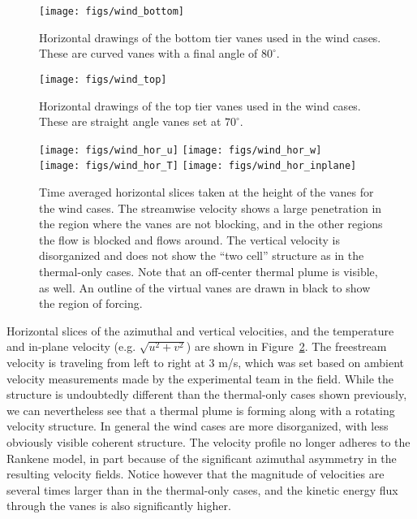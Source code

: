 \begin{figure}[htb]
\centering
\begin{minipage}{0.45\textwidth}
\centering
 \texttt{[image: figs/wind\_bottom]}
 \caption{Horizontal drawings of the bottom tier vanes used in the wind
 cases. These are curved vanes with a final angle of $80^{\circ}$.}
 \label{fig:wind_bottom}  
\end{minipage}\hfill
\begin{minipage}{0.45\textwidth}
\centering
\texttt{[image: figs/wind\_top]}
\caption{Horizontal drawings of the top tier vanes used in the wind
 cases. These are straight angle vanes set at $70^{\circ}$.} 
 \label{fig:wind_top}  
\end{minipage}
\end{figure}


%
%
\begin{figure}[htb]

  \centering
  \texttt{[image: figs/wind\_hor\_u]}
 \hfill
  \texttt{[image: figs/wind\_hor\_w]}
 \\
  \centering
  \texttt{[image: figs/wind\_hor\_T]}
 \hfill
  \texttt{[image: figs/wind\_hor\_inplane]}
 \caption{Time averaged horizontal slices taken at the height of the
 vanes for the wind cases. The streamwise velocity shows a large
 penetration in the region where the vanes are not blocking, and in the
 other regions the flow is blocked and flows around. The vertical
 velocity is disorganized and does not show the ``two cell'' structure
 as in the thermal-only cases.  Note that an off-center thermal plume is
 visible, as well. An outline of the virtual vanes are drawn in black to
 show the region of forcing.}  
 \label{fig:wind-hor}
\end{figure}


Horizontal slices of the azimuthal and vertical velocities, and the 
temperature and in-plane velocity (e.g. $\sqrt{u^2 + v^2}$) are shown in
Figure~\ref{fig:wind-hor}. The freestream velocity is traveling from
left to right at 3 m/s, which was set based on ambient velocity
measurements made by the experimental team in the field. While the
structure is undoubtedly different than the thermal-only cases shown
previously, we can nevertheless see that a thermal plume is forming
along with a rotating velocity structure. In general the wind cases are
more disorganized, with less obviously visible coherent
structure. The velocity profile no longer adheres to the Rankene model,
in part because of the significant azimuthal asymmetry in the resulting
velocity fields. 
Notice however that the magnitude of velocities are several
times larger than in the thermal-only cases, and the kinetic energy flux
through the vanes is also significantly higher.    

